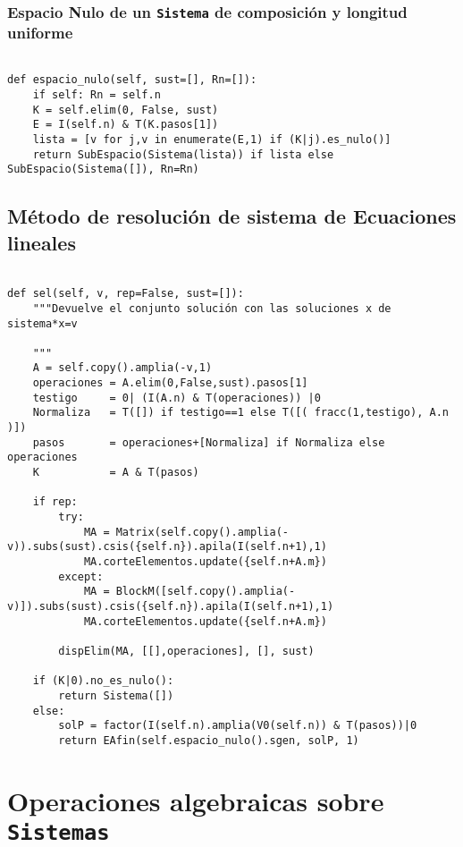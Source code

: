 \documentclass[11pt]{report}
\begin{document}
\subsubsection{Espacio Nulo de un \texttt{Sistema} de composición y longitud uniforme}
\label{sec:org2cc7603}

\begin{verbatim}

def espacio_nulo(self, sust=[], Rn=[]):
    if self: Rn = self.n
    K = self.elim(0, False, sust)
    E = I(self.n) & T(K.pasos[1])
    lista = [v for j,v in enumerate(E,1) if (K|j).es_nulo()]
    return SubEspacio(Sistema(lista)) if lista else SubEspacio(Sistema([]), Rn=Rn)

\end{verbatim}

\subsection{Método de resolución de sistema de Ecuaciones lineales}
\label{sec:org64bf81b}
\begin{verbatim}

def sel(self, v, rep=False, sust=[]):
    """Devuelve el conjunto solución con las soluciones x de sistema*x=v

    """
    A = self.copy().amplia(-v,1)
    operaciones = A.elim(0,False,sust).pasos[1]
    testigo     = 0| (I(A.n) & T(operaciones)) |0
    Normaliza   = T([]) if testigo==1 else T([( fracc(1,testigo), A.n )])
    pasos       = operaciones+[Normaliza] if Normaliza else operaciones
    K           = A & T(pasos)
    
    if rep:
        try:
            MA = Matrix(self.copy().amplia(-v)).subs(sust).csis({self.n}).apila(I(self.n+1),1)
            MA.corteElementos.update({self.n+A.m})
        except:
            MA = BlockM([self.copy().amplia(-v)]).subs(sust).csis({self.n}).apila(I(self.n+1),1)
            MA.corteElementos.update({self.n+A.m})
            
        dispElim(MA, [[],operaciones], [], sust)
    
    if (K|0).no_es_nulo():
        return Sistema([])
    else:
        solP = factor(I(self.n).amplia(V0(self.n)) & T(pasos))|0
        return EAfin(self.espacio_nulo().sgen, solP, 1)

\end{verbatim}

\section{Operaciones algebraicas sobre \texttt{Sistemas}}
\label{sec:org8e2263c}
\end{document}
